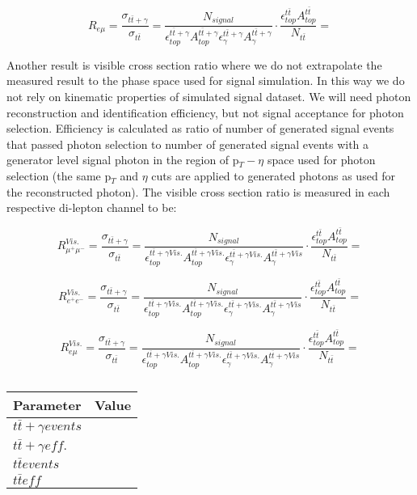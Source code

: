 \begin{equation}
	R_{e\mu} = \frac{\sigma_{t\bar{t}+\gamma}}{\sigma_{t\bar{t}}} = \frac{N_{signal}}{\epsilon^{t\bar{t}+\gamma}_{top} A^{t\bar{t}+\gamma}_{top} \epsilon^{t\bar{t}+\gamma}_{\gamma} A^{t\bar{t}+\gamma}_{\gamma}} \cdot \frac{\epsilon^{t\bar{t}}_{top} A^{t\bar{t}}_{top}}{N_{t\bar{t}}} = 
\end{equation}

Another result is visible cross section ratio where we do not extrapolate the measured result to the phase space used for signal simulation. In this way we do not rely on kinematic properties of simulated signal dataset. We will need photon reconstruction and identification efficiency, but not signal acceptance for photon selection. Efficiency is calculated as ratio of number of generated signal events that passed photon selection to number of generated signal events with a generator level signal photon in the region of p$_T - \eta$ space used for photon selection (the same p$_T$ and $\eta$ cuts are applied to generated photons as used for the reconstructed photon). The visible cross section ratio is measured in each respective di-lepton channel to be:

\begin{equation}
	R^{Vis.}_{\mu^+\mu^-} = \frac{\sigma_{t\bar{t}+\gamma}}{\sigma_{t\bar{t}}} = \frac{N_{signal}}{\epsilon^{t\bar{t}+\gamma Vis.}_{top} A^{t\bar{t}+\gamma Vis.}_{top} \epsilon^{t\bar{t}+\gamma Vis.}_{\gamma} A^{t\bar{t}+\gamma Vis}_{\gamma}} \cdot \frac{\epsilon^{t\bar{t}}_{top} A^{t\bar{t}}_{top}}{N_{t\bar{t}}} = 
\end{equation}

\begin{equation}
	R^{Vis.}_{e^+e^-} = \frac{\sigma_{t\bar{t}+\gamma}}{\sigma_{t\bar{t}}} = \frac{N_{signal}}{\epsilon^{t\bar{t}+\gamma Vis.}_{top} A^{t\bar{t}+\gamma Vis.}_{top} \epsilon^{t\bar{t}+\gamma Vis.}_{\gamma} A^{t\bar{t}+\gamma Vis}_{\gamma}} \cdot \frac{\epsilon^{t\bar{t}}_{top} A^{t\bar{t}}_{top}}{N_{t\bar{t}}} = 
\end{equation}

\begin{equation}
	R^{Vis.}_{e\mu} = \frac{\sigma_{t\bar{t}+\gamma}}{\sigma_{t\bar{t}}} = \frac{N_{signal}}{\epsilon^{t\bar{t}+\gamma Vis.}_{top} A^{t\bar{t}+\gamma Vis.}_{top} \epsilon^{t\bar{t}+\gamma Vis.}_{\gamma} A^{t\bar{t}+\gamma Vis}_{\gamma}} \cdot \frac{\epsilon^{t\bar{t}}_{top} A^{t\bar{t}}_{top}}{N_{t\bar{t}}} = 
\end{equation}

\begin{table}
\centering
\begin{tabular}{|l|l|}
\hline
	\textbf{Parameter} & \textbf{Value} \\
\hline
	$t\bar{t}+\gamma events$ & \\
	$t\bar{t}+\gamma eff.$ & \\
	$t\bar{t} events$ & \\
	$t\bar{t} eff$ & \\
\hline
\end{tabular}
\caption{}
\end{table}	
